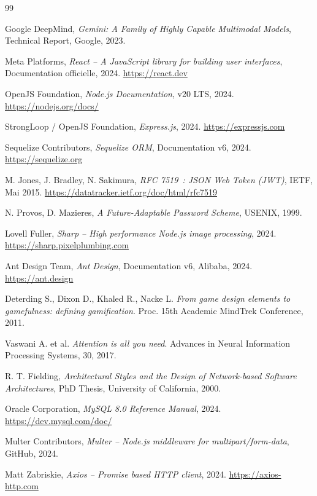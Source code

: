 \documentclass[12pt, a4paper, twoside, openany]{report}
\begin{document}
\begin{thebibliography}{99}

Google DeepMind, \textit{Gemini: A Family of Highly Capable Multimodal Models},
Technical Report, Google, 2023.

Meta Platforms, \textit{React -- A JavaScript library for building user interfaces},
Documentation officielle, 2024.
\url{https://react.dev}

OpenJS Foundation, \textit{Node.js Documentation}, v20 LTS, 2024.
\url{https://nodejs.org/docs/}

StrongLoop / OpenJS Foundation, \textit{Express.js}, 2024.
\url{https://expressjs.com}

Sequelize Contributors, \textit{Sequelize ORM}, Documentation v6, 2024.
\url{https://sequelize.org}

M. Jones, J. Bradley, N. Sakimura,
\textit{RFC 7519~: JSON Web Token (JWT)}, IETF, Mai 2015.
\url{https://datatracker.ietf.org/doc/html/rfc7519}

N. Provos, D. Mazieres,
\textit{A Future-Adaptable Password Scheme}, USENIX, 1999.

Lovell Fuller, \textit{Sharp -- High performance Node.js image processing}, 2024.
\url{https://sharp.pixelplumbing.com}

Ant Design Team, \textit{Ant Design}, Documentation v6, Alibaba, 2024.
\url{https://ant.design}

Deterding S., Dixon D., Khaled R., Nacke L.
\textit{From game design elements to gamefulness: defining gamification}.
Proc. 15th Academic MindTrek Conference, 2011.

Vaswani A. et al.
\textit{Attention is all you need}.
Advances in Neural Information Processing Systems, 30, 2017.

R. T. Fielding,
\textit{Architectural Styles and the Design of Network-based Software Architectures},
PhD Thesis, University of California, 2000.

Oracle Corporation, \textit{MySQL 8.0 Reference Manual}, 2024.
\url{https://dev.mysql.com/doc/}

Multer Contributors, \textit{Multer -- Node.js middleware for multipart/form-data},
GitHub, 2024.

Matt Zabriskie, \textit{Axios -- Promise based HTTP client}, 2024.
\url{https://axios-http.com}

\end{thebibliography}
\end{document}

